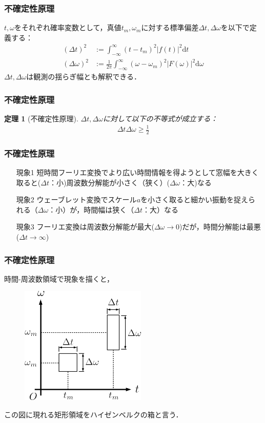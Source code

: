 \documentclass[dvipdfmx,graphicx,14pt]{beamer}
\newtheorem{mytheorem}{定理}
\begin{document}
\begin{frame}[c]
    \frametitle{不確定性原理}
    $t, \omega$をそれぞれ確率変数として，真値$t_{m}, \omega_{m}$に対する標準偏差$\Delta t, \Delta \omega$を以下で定義する：
    \begin{align}
        (\Delta t)^{2} &:= \int_{-\infty}^{\infty} (t - t_{m})^{2} |f(t)|^{2} \mathrm{d}t \\
        (\Delta \omega)^{2} &:= \frac{1}{2\pi} \int_{-\infty}^{\infty} (\omega - \omega_{m})^{2} |F(\omega)|^{2} \mathrm{d}\omega 
    \end{align}
    $\Delta t, \Delta \omega$は観測の揺らぎ幅とも解釈できる．
\end{frame}

\begin{frame}[c]
    \frametitle{不確定性原理}
    \begin{mytheorem}[不確定性原理]
        $\Delta t, \Delta \omega$に対して以下の不等式が成立する：
        \begin{align}
            \Delta t \Delta \omega \geq \frac{1}{2}
        \end{align}
    \end{mytheorem}
\end{frame}

\begin{frame}[c]
    \frametitle{不確定性原理}
    \begin{itemize}
        \item[現象1] 短時間フーリエ変換でより広い時間情報を得ようとして窓幅を大きく取ると($\Delta t$：小)周波数分解能が小さく（狭く）($\Delta \omega$：大)なる
        \item[現象2] ウェーブレット変換でスケール$a$を小さく取ると細かい振動を捉えられる（$\Delta \omega$：小）が，時間幅は狭く（$\Delta t$：大）なる
        \item[現象3] フーリエ変換は周波数分解能が最大($\Delta \omega \to 0$)だが，時間分解能は最悪($\Delta t \to \infty$)
    \end{itemize}
\end{frame}

\begin{frame}[c]
    \frametitle{不確定性原理}
    時間-周波数領域で現象を描くと，
    \begin{figure}
        \includegraphics[width=60mm]{./figs/heisenburg_box.png}
    \end{figure}
    この図に現れる矩形領域をハイゼンベルクの箱と言う．
\end{frame}
\end{document}
